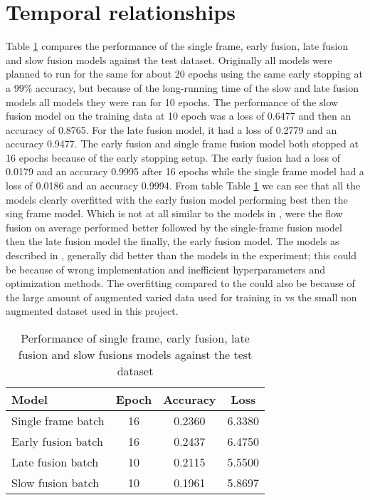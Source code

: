 \section{Temporal relationships}
Table \ref{fusions} compares the performance of the single frame, early fusion, late fusion and slow fusion models against the test dataset. Originally all models were planned to run for the same for about 20 epochs using the same early stopping at a 99\% accuracy, but because of the long-running time of the slow and late fusion models all models they were ran for 10 epochs. The performance of the slow fusion model on the training data at 10 epoch was a loss of 0.6477 and then an accuracy of 0.8765.  For the late fusion model, it had a loss of 0.2779  and an accuracy 0.9477.  The early fusion and single frame fusion model  both stopped at 16 epochs because of the early stopping setup. The early fusion had a loss of 0.0179  and an accuracy 0.9995 after 16 epochs while the single frame model had a loss of 0.0186 and an accuracy 0.9994.
From table Table \ref{fusions} we can see that all the models clearly overfitted with the early fusion model performing best then the sing frame model.  Which is not at all similar to the models in \citep{KarpathyCVPR14}, were the flow fusion on average performed better followed by the single-frame fusion model then the late fusion model the finally, the early fusion model. The models as described in \citep{KarpathyCVPR14}, generally did better than the models in the experiment; this could be because of wrong implementation and inefficient hyperparameters and optimization methods.  The overfitting compared to the \citep{KarpathyCVPR14} could also be because of the large amount of augmented varied data used for training in \citep{KarpathyCVPR14}  vs the small non augmented dataset used in this project.
 
\begin{table}[h!]
\centering
\begin{tabular}{ |l|c|c|c| } 
 \hline
 Model & Epoch & Accuracy & Loss \\ 
  \hline
 Single frame batch  & 16   & 0.2360 & 6.3380 \\ 
 Early fusion batch  & 16 & 0.2437 &  6.4750 \\
 Late fusion batch   & 10 & 0.2115 & 5.5500 \\
Slow fusion batch   & 10 & 0.1961& 5.8697\\
 \hline
\end{tabular}
\caption{ Performance of single frame, early fusion, late fusion and slow fusions models against the test dataset}
\label{fusions}
\end{table}

